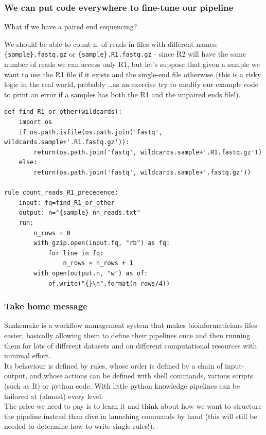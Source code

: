 \documentclass[xcolor=table]{beamer}
\begin{document}
\begin{frame}
\frametitle{We can put code everywhere to fine-tune our pipeline}
What if we have a paired end sequencing?

We should be able to count n. of reads in \textcolor{beer}{files with different names}:
\texttt{\{sample\}.fastq.gz} or \texttt{\{sample\}.R1.fastq.gz} - since R2 will have the same
number of reads we can access only R1, but let's suppose that given a sample we want to use the R1 file
if it exists and the single-end file otherwise (this is a risky logic in the real world, probably \ldots as an 
exercise try to modify our example code to print an error if a samples has both the R1 and the unpaired ends file!).

\end{frame}


\begin{frame}[fragile]
\begin{lstlisting}[basicstyle=\tiny]
def find_R1_or_other(wildcards):
    import os
    if os.path.isfile(os.path.join('fastq', wildcards.sample+'.R1.fastq.gz')):
        return(os.path.join('fastq', wildcards.sample+'.R1.fastq.gz'))
    else:
        return(os.path.join('fastq', wildcards.sample+'.fastq.gz'))

rule count_reads_R1_precedence:
    input: fq=find_R1_or_other
    output: n="{sample}_nn_reads.txt"
    run: 
        n_rows = 0
        with gzip.open(input.fq, "rb") as fq:
            for line in fq:
                n_rows = n_rows + 1
        with open(output.n, "w") as of:
            of.write("{}\n".format(n_rows/4))
\end{lstlisting}
\end{frame}


\begin{frame}
\frametitle{Take home message}
Snakemake is a workflow management system that makes bioinformaticians lifes easier, basically allowing them
to define their \textcolor{galon}{pipelines} once and then running them for lots of different datasets and on different
computational resources with minimal effort. \\
Its behaviour is defined by \textcolor{novak}{rules}, whose order is defined by a chain of input-output, and whose actions
can be defined with shell commands, various scripts (such as R) or python code. With little python knowledge pipelines can be tailored
at (almost) every level.
\\ The price we need to pay is to learn it and think about how we want to structure
the pipeline instead than dive in launching commands by hand (this will still be needed to determine how to write single rules!).
\end{frame}
\end{document}
